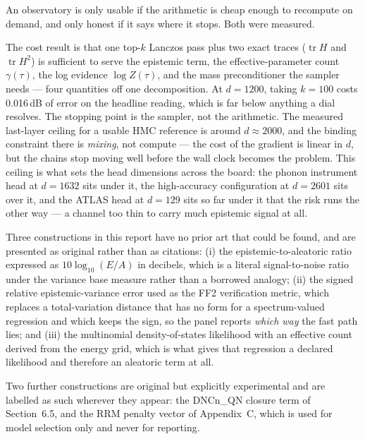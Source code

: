 \documentclass[11pt]{article}
\begin{document}

An observatory is only usable if the arithmetic is cheap enough to recompute on
demand, and only honest if it says where it stops. Both were measured.

The cost result is that one top-$k$ Lanczos pass plus two exact traces
($\operatorname{tr}H$ and $\operatorname{tr}H^2$) is sufficient to serve the
epistemic term, the effective-parameter count $\gamma(\tau)$, the log evidence
$\log Z(\tau)$, and the mass preconditioner the sampler needs --- four
quantities off one decomposition. At $d=1200$, taking $k=100$ costs
0.016\,dB of error on the headline reading, which is far below anything a dial
resolves. 
The stopping point is the sampler, not the arithmetic. The measured
last-layer ceiling for a usable HMC reference is around $d\approx2000$, and
the binding constraint there is \emph{mixing}, not compute --- the cost of the
gradient is linear in $d$, but the chains stop moving well before the wall
clock becomes the problem. This ceiling is what sets the head dimensions
across the board: the phonon instrument head at $d=1632$ sits under it, the
high-accuracy configuration at $d=2601$ sits over it, and the ATLAS head at
$d=129$ sits so far under it that the risk runs the other way --- a channel
too thin to carry much epistemic signal at all.


Three constructions in this report have no prior art that could be found, and
are presented as original rather than as citations: (i) the
epistemic-to-aleatoric ratio expressed as $10\log_{10}(E/A)$ in decibels,
which is a literal signal-to-noise ratio under the variance base measure
rather than a borrowed analogy; (ii) the signed relative
epistemic-variance error used as the FF2 verification metric, which replaces a
total-variation distance that has no form for a spectrum-valued regression and
which keeps the sign, so the panel reports \emph{which way} the fast path
lies; and (iii) the multinomial density-of-states likelihood with an effective
count derived from the energy grid, which is what gives that regression a
declared likelihood and therefore an aleatoric term at all.

Two further constructions are original but explicitly experimental and are
labelled as such wherever they appear: the DNCn\_QN closure term of
Section~6.5, and the RRM penalty vector of Appendix~C, which is used for model
selection only and never for reporting.
\end{document}
